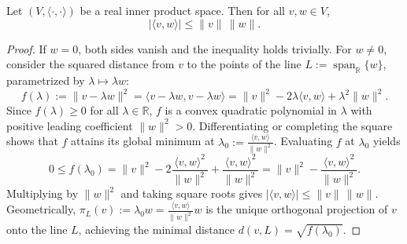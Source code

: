 \begin{remark}
\begin{center}
\end{center}
\end{remark}

\begin{proposition}
\label{prop:cauchy_schwarz_geometric_proof}
Let $(V, \langle\cdot,\cdot\rangle)$ be a real inner product space. Then for all $v, w \in V$,
\[
|\langle v, w\rangle| \leq \|v\|\,\|w\|.
\]
\end{proposition}

\begin{proof}
If $w = 0$, both sides vanish and the inequality holds trivially. For $w \neq 0$, consider the squared distance from $v$ to the points of the line $L := \operatorname{span}_{\mathbb{R}}\{w\}$, parametrized by $\lambda \mapsto \lambda w$:
\[
f(\lambda) := \|v - \lambda w\|^2 = \langle v - \lambda w, v - \lambda w\rangle = \|v\|^2 - 2\lambda\langle v, w\rangle + \lambda^2\|w\|^2.
\]
Since $f(\lambda) \geq 0$ for all $\lambda \in \mathbb{R}$, $f$ is a convex quadratic polynomial in $\lambda$ with positive leading coefficient $\|w\|^2 > 0$. Differentiating or completing the square shows that $f$ attains its global minimum at $\lambda_0 := \frac{\langle v, w\rangle}{\|w\|^2}$. Evaluating $f$ at $\lambda_0$ yields
\[
0 \leq f(\lambda_0) = \|v\|^2 - 2\frac{\langle v, w\rangle^2}{\|w\|^2} + \frac{\langle v, w\rangle^2}{\|w\|^2} = \|v\|^2 - \frac{\langle v, w\rangle^2}{\|w\|^2}.
\]
Multiplying by $\|w\|^2$ and taking square roots gives $|\langle v, w\rangle| \leq \|v\|\,\|w\|$. Geometrically, $\pi_L(v) := \lambda_0 w = \frac{\langle v, w\rangle}{\|w\|^2}w$ is the unique orthogonal projection of $v$ onto the line $L$, achieving the minimal distance $d(v, L) = \sqrt{f(\lambda_0)}$.
\end{proof}

